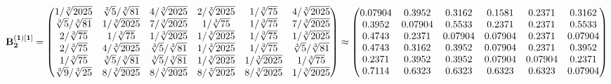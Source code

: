 \documentclass[10pt,a4paper]{article}
\begin{document}
	\[
		\bold{B_2^{(1)[1]}} = 
		\begin{pmatrix}
			{1} / {\sqrt[3]{2025}} & {\sqrt[3]{5}} / {\sqrt[3]{81}} & {{4}} / {\sqrt[3]{2025}} & {{2}} / {\sqrt[3]{2025}} & {1} / {\sqrt[3]{75}} & {{4}} / {\sqrt[3]{2025}} \\
			{\sqrt[3]{5}} / {\sqrt[3]{81}} & {1} / {\sqrt[3]{2025}} & {{7}} / {\sqrt[3]{2025}} & {1} / {\sqrt[3]{75}} & {1} / {\sqrt[3]{75}} & {{7}} / {\sqrt[3]{2025}} \\
			{{2}} / {\sqrt[3]{75}} & {1} / {\sqrt[3]{75}} & {1} / {\sqrt[3]{2025}} & {1} / {\sqrt[3]{2025}} & {1} / {\sqrt[3]{75}} & {1} / {\sqrt[3]{2025}} \\
			{{2}} / {\sqrt[3]{75}} & {{4}} / {\sqrt[3]{2025}} & {\sqrt[3]{5}} / {\sqrt[3]{81}} & {1} / {\sqrt[3]{2025}} & {1} / {\sqrt[3]{75}} & {\sqrt[3]{5}} / {\sqrt[3]{81}} \\
			{1} / {\sqrt[3]{75}} & {\sqrt[3]{5}} / {\sqrt[3]{81}} & {\sqrt[3]{5}} / {\sqrt[3]{81}} & {1} / {\sqrt[3]{2025}} & {1} / {\sqrt[3]{2025}} & {1} / {\sqrt[3]{75}} \\
			{\sqrt[3]{9}} / {\sqrt[3]{25}} & {{8}} / {\sqrt[3]{2025}} & {{8}} / {\sqrt[3]{2025}} & {{8}} / {\sqrt[3]{2025}} & {{8}} / {\sqrt[3]{2025}} & {1} / {\sqrt[3]{2025}} \\
		\end{pmatrix}
		\approx
		\begin{pmatrix}
			0.07904  & 0.3952   & 0.3162   & 0.1581   & 0.2371   & 0.3162   \\
			0.3952   & 0.07904  & 0.5533   & 0.2371   & 0.2371   & 0.5533   \\
			0.4743   & 0.2371   & 0.07904  & 0.07904  & 0.2371   & 0.07904  \\
			0.4743   & 0.3162   & 0.3952   & 0.07904  & 0.2371   & 0.3952   \\
			0.2371   & 0.3952   & 0.3952   & 0.07904  & 0.07904  & 0.2371   \\
			0.7114   & 0.6323   & 0.6323   & 0.6323   & 0.6323   & 0.07904  \\
		\end{pmatrix}
	\]
\end{document}
